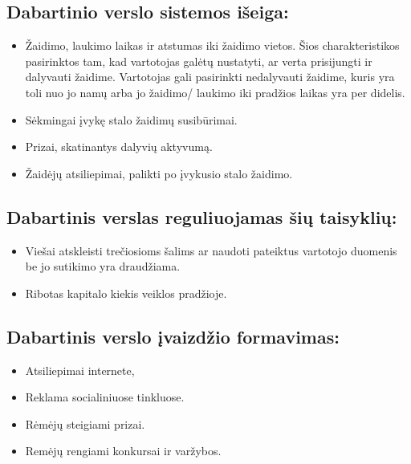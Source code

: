 \documentclass{VUMIFPSkursinis}
\begin{document}
	\subsection{Dabartinio verslo sistemos išeiga:}
		\renewcommand{\labelitemi}{$\bullet$}
			\begin{itemize}
				\item Žaidimo, laukimo laikas ir atstumas iki žaidimo vietos. 
				Šios charakteristikos pasirinktos tam, kad vartotojas galėtų 
				nustatyti, ar verta prisijungti ir dalyvauti žaidime. Vartotojas 
				gali pasirinkti nedalyvauti žaidime, kuris yra toli nuo jo namų 
				arba jo žaidimo/ laukimo iki pradžios laikas yra per didelis.
				\item Sėkmingai įvykę stalo žaidimų susibūrimai.
				\item Prizai, skatinantys dalyvių aktyvumą.
				\item Žaidėjų atsiliepimai, palikti po įvykusio stalo žaidimo.
			\end{itemize}
	\subsection{Dabartinis verslas reguliuojamas šių taisyklių:}
		\renewcommand{\labelitemi}{$\bullet$}
			\begin{itemize}
				\item Viešai atskleisti trečiosioms šalims ar naudoti pateiktus 
				vartotojo duomenis be jo sutikimo yra draudžiama.
				\item Ribotas kapitalo kiekis veiklos pradžioje.
			\end{itemize}
	\subsection{Dabartinis verslo įvaizdžio formavimas:}
		\renewcommand{\labelitemi}{$\bullet$}
			\begin{itemize}
				\item Atsiliepimai internete,
				\item Reklama socialiniuose tinkluose.
				\item Rėmėjų steigiami prizai.
				\item Remėjų rengiami konkursai ir varžybos.
			\end{itemize}
			
\end{document}
